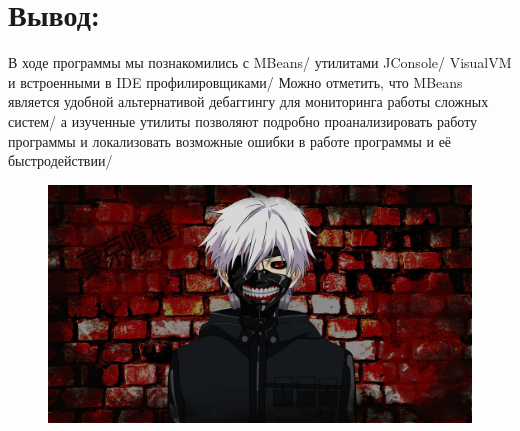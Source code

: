 \section{Вывод:}
В ходе программы мы познакомились с MBeans/ утилитами JConsole/ VisualVM и встроенными в IDE профилировщиками/ Можно отметить, что MBeans является
удобной альтернативой дебаггингу для мониторинга работы сложных систем/ а изученные утилиты позволяют подробно проанализировать работу программы и локализовать
возможные ошибки в работе программы и её быстродействии/
\vspace{3cm}
\begin{figure}[H]
    \centering
    \includegraphics[scale=0.2]{img/39044}
\end{figure}